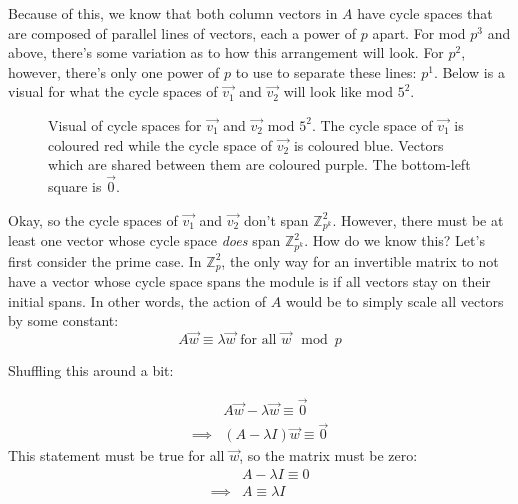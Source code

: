 \documentclass[a4paper, 12pt, reqno]{amsart}
\begin{document}
	Because of this, we know that both column vectors in $A$ have cycle spaces that are composed of parallel lines of vectors, each a power of $p$ apart. For mod $p^3$ and above,
	there's some variation as to how this arrangement will look. For $p^2$, however, there's only one power of $p$ to use to separate these lines: $p^1$. Below is a visual for what
	the cycle spaces of $\vec{v_1}$ and $\vec{v_2}$ will look like mod $5^2$. 
	
	\begin{figure}[b]
		\centering
		\caption{Visual of cycle spaces for $\vec{v_1}$ and $\vec{v_2}$ mod $5^2$. The cycle space of $\vec{v_1}$ is coloured red while the cycle space of $\vec{v_2}$ is
		coloured blue. Vectors which are shared between them are coloured purple. The bottom-left square is $\vec{0}$.}
	\end{figure}
	
	Okay, so the cycle spaces of $\vec{v_1}$ and $\vec{v_2}$ don't span $\mathds{Z}_{p^k}^2$. However, there must be at least one vector whose cycle space \emph{does} span
	$\mathds{Z}_{p^k}^2$. How do we know this? Let's first consider the prime case. In $\mathds{Z}_{p}^2$, the only way for an invertible matrix to not have a vector whose cycle
	space spans the module is if all vectors stay on their initial spans. In other words, the action of $A$ would be to simply scale all vectors by some constant:
	\[
		A\vec{w} \equiv \lambda\vec{w} \,\, \text{for all $\vec{w}$} \mod{p}
	\]
	
	Shuffling this around a bit:
	
	\begin{align*}
		         & A\vec{w} - \lambda\vec{w} \equiv \vec{0} \\
		\implies & (A - \lambda I)\vec{w} \equiv \vec{0}
	\end{align*}
	This statement must be true for all $\vec{w}$, so the matrix must be zero:
	\begin{align*}
		         & A - \lambda I \equiv 0 \\
		\implies & A \equiv \lambda I
	\end{align*}
	
\end{document}
